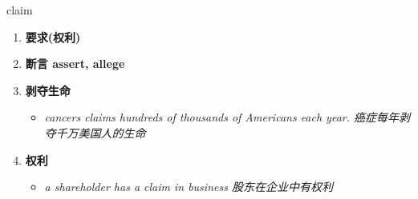 
\begin{frame}
{\huge claim}
\begin{center}
\begin{enumerate}\Large
  \item \textbf{要求(权利)}
  \item \textbf{断言 assert, allege}
  \item \textbf{剥夺生命}
  \begin{itemize}
    \item \em{\Large{cancers claims hundreds of thousands of Americans each year. 癌症每年剥夺千万美国人的生命}}
  \end{itemize}
  \item \textbf{权利}
  \begin{itemize}
    \item \em{\Large{a shareholder has a claim in business 股东在企业中有权利}}
  \end{itemize}
\end{enumerate}
\end{center}
\end{frame}
